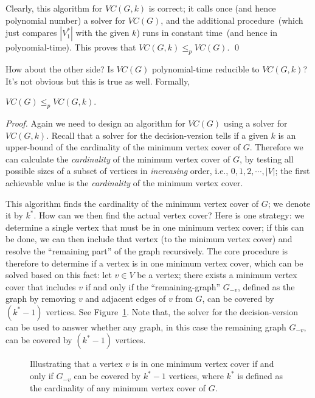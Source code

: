 Clearly, this algorithm for $VC(G, k)$ is correct; it calls once (and hence polynomial number)
a solver for $VC(G)$, and the additional procedure~(which just compares $|V_1^*|$ with the given $k$)
runs in constant time~(and hence in polynomial-time). This proves that $VC(G, k)\le_p VC(G)$. \qed

How about the other side? Is $VC(G)$ polynomial-time reducible to $VC(G, k)$? It's not obvious but 
this is true as well. Formally,
\begin{fact}
$VC(G)\le_p VC(G, k)$.
\end{fact}
\emph{Proof.}  Again we need to design an algorithm for $VC(G)$ using a solver for $VC(G, k)$.
Recall that a solver for the decision-version tells if a given $k$ is an upper-bound of the
cardinality of the minimum vertex cover of $G$. 
Therefore we can calculate the \emph{cardinality} of the minimum vertex cover of $G$,
by testing all possible sizes of a subset of vertices in \emph{increasing} order,
   i.e., $0, 1, 2, \cdots, |V|$;
the first achievable value is the \emph{cardinality} of the minimum vertex cover.

\begin{algorithmblock}[0.8\textwidth]
	\xxx
	\xxx
	\xxx
	\xxx
\end{algorithmblock}

This algorithm finds the cardinality of the minimum vertex cover of $G$; we denote it by $k^*$.
How can we then find the actual vertex cover? Here is one strategy:
we determine a single vertex that must be in one minimum vertex cover; if
this can be done, we can then
include that vertex (to the minimum vertex cover) and resolve the ``remaining part'' of the graph recursively.
The core procedure is therefore to determine if a vertex is in one minimum vertex cover,
which can be solved based on this fact: let $v\in V$ be a vertex; 
there exists a minimum vertex cover that includes $v$
if and only if the ``remaining-graph'' $G_{-v}$, defined as the graph by removing $v$ and adjacent edges of $v$ from $G$, can
be covered by $(k^* - 1)$ vertices. 
See Figure~\ref{fig:vertex-cover}.  
Note that, the solver for the decision-version can be used to answer 
whether any graph, in this case the remaining graph $G_{-v}$, can be covered by $(k^* - 1)$ vertices. 

\begin{figure}[h]
\centering{}
\caption{Illustrating that a vertex $v$ is in one minimum vertex cover if and only if
$G_{-v}$ can be covered by $k^* - 1$ vertices, where $k^*$ is defined as the cardinality of any minimum vertex cover of $G$.}
\label{fig:vertex-cover}
\end{figure}


